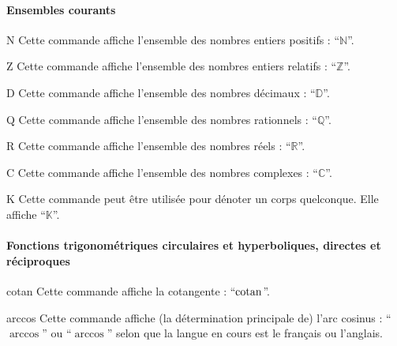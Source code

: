\paragraph{Ensembles courants}

\begin{docCommand}{N}{}
  Cette commande affiche l'ensemble des nombres entiers positifs :
  \enquote{$\mathbb{N}$}.
\end{docCommand}

\begin{docCommand}{Z}{}
  Cette commande affiche l'ensemble des nombres entiers relatifs :
  \enquote{$\mathbb{Z}$}.
\end{docCommand}

\begin{docCommand}{D}{}
  Cette commande affiche l'ensemble des nombres décimaux :
  \enquote{$\mathbb{D}$}.
\end{docCommand}

\begin{docCommand}{Q}{}
  Cette commande affiche l'ensemble des nombres rationnels :
  \enquote{$\mathbb{Q}$}.
\end{docCommand}

\begin{docCommand}{R}{}
  Cette commande affiche l'ensemble des nombres réels : \enquote{$\mathbb{R}$}.
\end{docCommand}

\begin{docCommand}{C}{}
  Cette commande affiche l'ensemble des nombres complexes :
  \enquote{$\mathbb{C}$}.
\end{docCommand}

\begin{docCommand}{K}{}
  Cette commande peut être utilisée pour dénoter un corps quelconque. Elle
  affiche \enquote{$\mathbb{K}$}.
\end{docCommand}

\paragraph{Fonctions trigonométriques circulaires et hyperboliques, directes et
  réciproques}

\begin{docCommand}{cotan}{}
  Cette commande affiche la cotangente : \enquote{$\operatorname{cotan}$}.
\end{docCommand}

\begin{docCommand}{arccos}{}
  Cette commande affiche (la détermination principale de) l'arc cosinus :
  \enquote{$\arccos$} ou
  \enquote{$\arccos$} selon que
  la langue en cours est le français ou l'anglais.
\end{docCommand}

